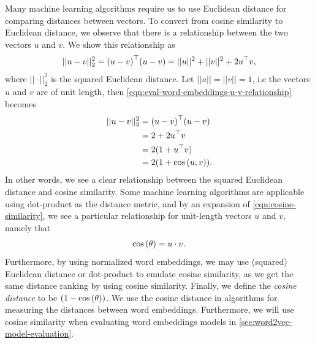 Many machine learning algorithms require us to use Euclidean distance for comparing distances between vectors. To convert from cosine similarity to Euclidean distance, we observe that there is a relationship between the two vectors $u$ and $v$. We show this relationship as
\begin{align}
    ||u - v||_2^2 = {(u - v)}^\top (u - v) = ||u||^2 + ||v||^2 + 2{u}^\top v,
    \label{eqn:eval-word-embeddings-u-v-relationship}
\end{align}
where $||\cdot||_2^2$ is the squared Euclidean distance. Let $||u|| = ||v|| = 1$, i.e the vectors $u$ and $v$ are of unit length, then \cref{eqn:eval-word-embeddings-u-v-relationship} becomes
\begin{align}
    ||u - v||_2^2
    &= {(u - v)}^\top (u - v) \\
    &= 2 + 2{u}^\top v \notag \\
    &= 2(1 + {u}^\top v) \notag \\
    &= 2(1 + \cos \left(u, v\right)). \notag
\end{align}
In other words, we see a clear relationship between the squared Euclidean distance and cosine similarity. Some machine learning algorithms are applicable using dot-product as the distance metric, and by an expansion of \cref{eqn:cosine-similarity}, we see a particular relationship for unit-length vectors $u$ and $v$, namely that
\begin{align}
    \cos\left(\theta\right) = u \cdot v.
\end{align}
Furthermore, by using normalized word embeddings, we may use (squared) Euclidean distance or dot-product to emulate cosine similarity, as we get the same distance ranking by using cosine similarity. Finally, we define the \textit{cosine distance} to be $(1 - \cos\left(\theta\right))$. We use the cosine distance in algorithms for measuring the distances between word embeddings. Furthermore, we will use cosine similarity when evaluating word embeddings models in \cref{sec:word2vec-model-evaluation}.
